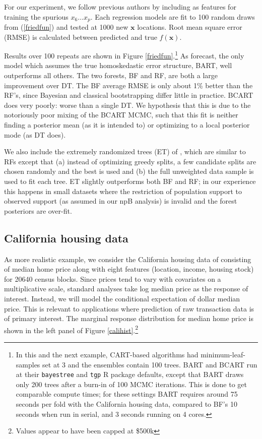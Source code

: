 \documentclass{article}
\begin{document}
For our experiment, we follow previous authors by including as features for
training the spurious $x_6 \dots x_{p}$. Each regression models are fit to 100
random draws from (\ref{friedfun}) and tested at 1000 new $\mathbf{x}$
locations. Root mean square error (RMSE) is
calculated between predicted and true $f(\mathbf{x})$.

Results over 100 repeats are shown in  Figure \ref{friedfun}.\footnote{In this and the next example, CART-based algorithms had minimum-leaf-samples set at 3 and the ensembles contain 100 trees.  BART and BCART run at their \texttt{bayestree} and \texttt{tgp} R package defaults, except that BART draws only 200 trees after a burn-in of 100 MCMC iterations.  This is done to get comparable compute times; for these settings BART requires around 75 seconds per fold with the California housing data, compared to BF's 10 seconds when run in serial, and 3 seconds running on 4 cores.}
As forecast, the only model which assumes the true homoskedastic error
structure, BART, well outperforms all others. The two forests, BF and
RF, are both a large improvement over DT. 
The BF average RMSE is only about 1\% better than the RF's,
since Bayesian and classical bootstrapping differ little in
practice. BCART does very poorly: worse than a single DT. We
hypothesis that this is due to the notoriously poor mixing of the BCART
MCMC, such that this fit is neither finding a posterior mean (as it is
intended to) or optimizing to a local posterior mode (as DT does).

We also include the extremely randomized trees (ET) of
\citet{geurts_extremely_2006}, which are similar to RFs except
that (a) instead of optimizing greedy splits, a few candidate splits are chosen
randomly and the best is used and (b) the full unweighted data sample is used to
fit each tree. ET slightly outperforms both BF and RF; in our experience this
happens in small datasets where the restriction of population support to
observed support (as assumed in our npB analysis) is invalid and the
forest posteriors are over-fit.


\subsection{California housing data}\label{california-housing-data}

As more realistic example, we consider the California housing data of \citet{calidata}
consisting of median home price along with eight features (location, income, housing stock) for 20640  census blocks. Since prices tend to vary with covariates on a multiplicative scale, standard analyses take  log median price as the response of
interest.  Instead, we will model the conditional expectation of
dollar median price.  This is relevant to applications where prediction of raw transaction data is of primary interest.  The marginal response distribution for median home price is shown in the left panel of  Figure \ref{calihist}.\footnote{Values appear to have been capped at \$500k}
\end{document}
